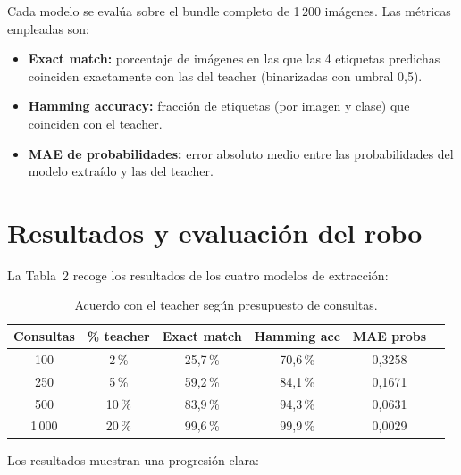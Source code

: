 \documentclass[11pt,a4paper]{article}
\begin{document}
Cada modelo se evalúa sobre el bundle completo de 1\,200 imágenes. Las métricas empleadas son:

\begin{itemize}
  \item \textbf{Exact match:} porcentaje de imágenes en las que las 4 etiquetas predichas coinciden exactamente con las del teacher (binarizadas con umbral 0,5).
  \item \textbf{Hamming accuracy:} fracción de etiquetas (por imagen y clase) que coinciden con el teacher.
  \item \textbf{MAE de probabilidades:} error absoluto medio entre las probabilidades del modelo extraído y las del teacher.
\end{itemize}

\section{Resultados y evaluación del robo}

La Tabla~2 recoge los resultados de los cuatro modelos de extracción:

\begin{table}[h]
  \centering
  \begin{tabular}{cccccc}
    \toprule
    \textbf{Consultas} & \textbf{\% teacher} & \textbf{Exact match} & \textbf{Hamming acc} & \textbf{MAE probs} \\
    \midrule
    100   & 2\,\%  & 25,7\,\% & 70,6\,\% & 0,3258 \\
    250   & 5\,\%  & 59,2\,\% & 84,1\,\% & 0,1671 \\
    500   & 10\,\% & 83,9\,\% & 94,3\,\% & 0,0631 \\
    1\,000 & 20\,\% & 99,6\,\% & 99,9\,\% & 0,0029 \\
    \bottomrule
  \end{tabular}
  \caption{Acuerdo con el teacher según presupuesto de consultas.}
\end{table}

Los resultados muestran una progresión clara:
\end{document}

